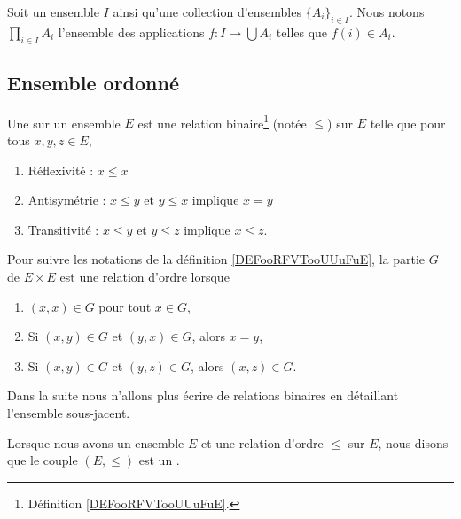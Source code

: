 \begin{definition}	\label{DEFooTYIMooZUsYJw}
	Soit un ensemble \( I\) ainsi qu'une collection d'ensembles \( \{ A_i \}_{i\in I}\). Nous notons \( \prod_{i\in I}A_i\) l'ensemble des applications \(f \colon I\to \bigcup A_i  \) telles que \( f(i)\in A_i\).
\end{definition}

\subsection{Ensemble ordonné}
\label{SUBooEnsembleOrdonne}


\begin{definition}      \label{DefooFLYOooRaGYRk}
	Une  sur un ensemble \( E\) est une relation binaire\footnote{Définition \ref{DEFooRFVTooUUuFuE}.} (notée \( \leq\)) sur \( E\) telle que pour tous \( x,y,z\in E\),
	\begin{enumerate}
		\item
		      Réflexivité : \( x\leq x\)
		\item \label{ITEMooQTXOooTZXEnu}
		      Antisymétrie : \( x\leq y\) et \( y\leq x\) implique \( x=y\)
		\item
		      Transitivité : \( x\leq y\) et \( y\leq z\) implique \( x\leq z\).
	\end{enumerate}

	Pour suivre les notations de la définition \ref{DEFooRFVTooUUuFuE}, la partie \( G\) de \( E\times E\) est une relation d'ordre lorsque
	\begin{enumerate}
		\item
		      \( (x,x)\in G\) pour tout \( x\in G\),
		\item
		      Si \( (x,y)\in G\) et \( (y,x)\in G\), alors \( x=y\),
		\item
		      Si \( (x,y)\in G\) et \( (y,z)\in G\), alors \( (x,z)\in G\).
	\end{enumerate}
	Dans la suite nous n'allons plus écrire de relations binaires en détaillant l'ensemble sous-jacent.

	Lorsque nous avons un ensemble \( E\) et une relation d'ordre \( \leq\) sur \( E\), nous disons que le couple \( (E,\leq)\) est un .
\end{definition}

